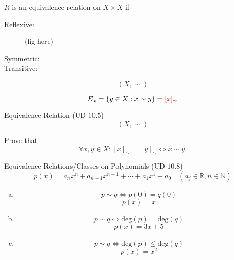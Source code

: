 \begin{frame}{}
  \begin{definition}
    $R$ is an equivalence relation on $X \times X$ if
    \begin{description}
      \item[Reflexive:] 
	(fig here)
      \item[Symmetric:] 
      \item[Transitive:] 
    \end{description}
  \end{definition}
\end{frame}

\begin{frame}{}
  \begin{definition}
    \[
      (X, \sim)
    \]

    \[
      E_{x} = \{y \in X: x \sim y\} \; \textcolor{red}{= [x]_{\sim}}
    \]
  \end{definition}
\end{frame}

\begin{frame}{}
  \begin{exampleblock}{Equivalence Relation (UD $10.5$)}
    \[
      (X, \sim)
    \]

    Prove that 
    \[
      \forall x, y \in X: [x]_{\sim} = [y]_{\sim} \iff x \sim y.
    \]
  \end{exampleblock}
\end{frame}

\begin{frame}{}
  \centerline{}


  \pause
\end{frame}

\begin{frame}{}
  \begin{exampleblock}{Equivalence Relations/Classes on Polynomials (UD $10.8$)}
    \[
      p(x) = a_n x^n + a_{n-1} x^{n-1} + \cdots + a_1 x^1 + a_0 \quad (a_j \in \mathbb{R}, n \in \mathbb{N})
    \]

    \begin{enumerate}[(a)]
      \item 
	\[
	  p \sim q \iff p(0) = q(0)
	\]
	\[
	  p(x) = x
	\]
      \item 
	\[
	  p \sim q \iff \text{deg}(p) = \text{deg}(q)
	\]
	\[
	  p(x) = 3x + 5
	\]
      \item 
	\[
	  p \sim q \iff \text{deg}(p) \le \text{deg}(q)
	\]
        \[
	  p(x) = x^2
	\]
    \end{enumerate}
  \end{exampleblock}
\end{frame}
